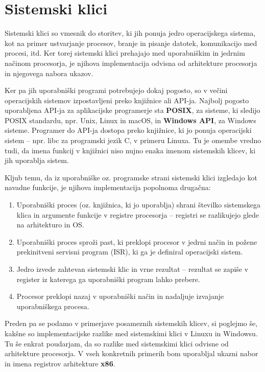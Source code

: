\documentclass[a4paper,12pt,openright]{book}
\begin{document}
\section{Sistemski klici}

Sistemski klici so vmesnik do storitev, ki jih ponuja jedro operacijskega sistema, kot na primer ustvarjanje procesov, branje in pisanje datotek, komunikacijo med procesi, itd.
Ker torej sistemski klici prehajajo med uporabniškim in jedrnim načinom procesorja, je njihova implementacija odvisna od arhitekture procesorja in njegovega nabora ukazov.

Ker pa jih uporabniški programi potrebujejo dokaj pogosto, so v večini operacijskih sistemov izpostavljeni preko knjižnice ali API-ja.
Najbolj pogosto uporabljena API-ja za aplikacijske programerje sta \textbf{POSIX}, za sisteme, ki sledijo POSIX standardu, npr. Unix, Linux in macOS, in \textbf{Windows API}, za Windows sisteme.
Programer do API-ja dostopa preko knjižnice, ki jo ponuja operacijski sistem -- npr. libc za programski jezik C, v primeru Linuxa.
Tu je omembe vredno tudi, da imena funkcij v knjižnici niso nujno enaka imenom sistemskih klicev, ki jih uporablja sistem.
\cite{Silberschatz_Galvin_Gagne_2018}

Kljub temu, da iz uporabniške oz. programske strani sistemski klici izgledajo kot navadne funkcije, je njihova implementacija popolnoma drugačna:
\begin{enumerate}
	\item Uporabniški proces (oz. knjižnica, ki jo uporablja) shrani številko sistemskega klica in argumente funkcije v registre procesorja -- registri se razlikujejo glede na arhitekturo in OS.
	\item Uporabniški proces sproži past, ki preklopi procesor v jedrni način in požene prekinitveni servisni program (ISR), ki ga je definiral operacijski sistem.
	\item Jedro izvede zahtevan sistemski klic in vrne rezultat -- rezultat se zapiše v register iz katerega ga uporabniški program lahko prebere.
	\item Procesor preklopi nazaj v uporabniški način in nadaljuje izvajanje uporabniškega procesa. \cite{Tanenbaum_Bos_2023}
\end{enumerate}

Preden pa se podamo v primerjave posameznih sistemskih klicev, si poglejmo še, kakšne so implementacijske razlike med sistemskimi klici v Linuxu in Windowsu.
Tu še enkrat poudarjam, da so razlike med sistemskimi klici odvisne od arhitekture procesorja.
V vseh konkretnih primerih bom uporabljal ukazni nabor in imena registrov arhitekture \textbf{x86}.
\end{document}
